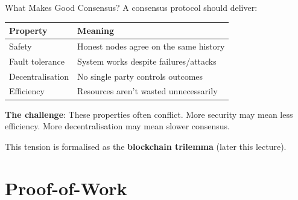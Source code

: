 \documentclass[10pt]{beamer}
\newcommand{\highlight}[1]{\textcolor{AccentOrange}{\textbf{#1}}}
\begin{document}
\begin{frame}{What Makes Good Consensus?}
  A consensus protocol should deliver:
  \begin{center}
  \begin{tabular}{lp{7.5cm}}
    \toprule
    \textbf{Property} & \textbf{Meaning} \\
    \midrule
    Safety & Honest nodes agree on the same history \\
    Fault tolerance & System works despite failures/attacks \\
    Decentralisation & No single party controls outcomes \\
    Efficiency & Resources aren't wasted unnecessarily \\
    \bottomrule
  \end{tabular}
  \end{center}
  
  \vspace{1em}
  \textbf{The challenge}: These properties often conflict. More security may mean less efficiency. More decentralisation may mean slower consensus.
  
  \vspace{1em}
  This tension is formalised as the \highlight{blockchain trilemma} (later this lecture).
\end{frame}

\section{Proof-of-Work}
\end{document}
